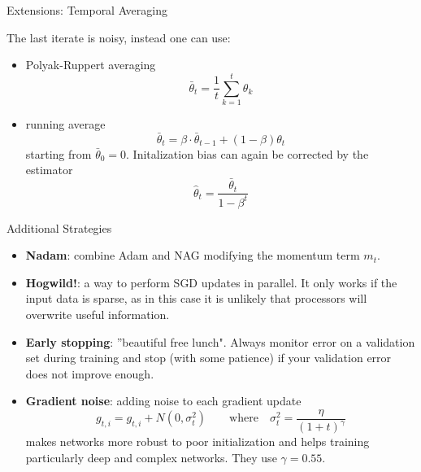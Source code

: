 \documentclass[english]{article}
\begin{document}

\item {Extensions: Temporal Averaging}

The last iterate is noisy, instead one can use:

\begin{itemize}
\item Polyak-Ruppert averaging
$$\bar{\theta}_t = \frac1t \sum_{k=1}^t \theta_k$$ 
\item running average
$$\bar{\theta}_t = \beta \cdot \bar{\theta}_{t-1} + (1-\beta) \theta_t $$
starting from $\bar{\theta}_0 = 0$. Initalization bias can again be corrected by the estimator 
$$\hat{\theta}_t = \frac{\bar{\theta}_t}{1-\beta^t}$$
\end{itemize}












\item {Additional Strategies}

\begin{itemize}
\item \textbf{Nadam}: combine Adam and NAG modifying the momentum term $m_t$.


\item \textbf{Hogwild!}: a way to perform SGD updates in parallel. It only works if the input data is sparse, as in this case it is unlikely that processors will overwrite useful information.


\item \textbf{Early stopping}: ''beautiful free lunch". Always monitor error on a validation set during training and stop (with some patience) if your validation error does not improve enough.


\item \textbf{Gradient noise}: adding noise to each gradient update
$$g_{t, i} = g_{t, i} + N(0, \sigma^2_t) \qquad\text{where}\quad \sigma^2_t = \frac{\eta}{(1+t)^\gamma}$$
makes networks more robust to poor initialization and helps training particularly deep and complex networks. They use $\gamma = 0.55$.
\end{itemize}







\end{document}
